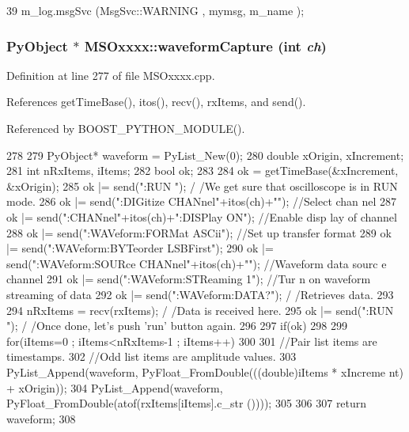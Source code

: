 \begin{DoxyCode}
39 { m_log.msgSvc (MsgSvc::WARNING , mymsg, m_name ); }
\end{DoxyCode}
\hypertarget{classMSOxxxx_aed78c680bcec9e14a88eedf7b291518c}{
\subsubsection[{waveformCapture}]{\setlength{\rightskip}{0pt plus 5cm}PyObject $\ast$ MSOxxxx::waveformCapture (int {\em ch})}}
\label{classMSOxxxx_aed78c680bcec9e14a88eedf7b291518c}


Definition at line 277 of file MSOxxxx.cpp.

References getTimeBase(), itos(), recv(), rxItems, and send().

Referenced by BOOST\_\-PYTHON\_\-MODULE().


\begin{DoxyCode}
278 {
279     PyObject* waveform = PyList_New(0);
280     double xOrigin, xIncrement;
281     int nRxItems, iItems;
282     bool ok;
283 
284     ok  = getTimeBase(&xIncrement, &xOrigin);
285     ok |= send(":RUN \n");                                                                  /
      /We get sure that oscilloscope is in RUN mode.
286     ok |= send(":DIGitize CHANnel"+itos(ch)+"\n");                  //Select chan
      nel
287     ok |= send(":CHANnel"+itos(ch)+":DISPlay ON\n");                //Enable disp
      lay of channel
288     ok |= send(":WAVeform:FORMat ASCii\n");                                 //Set
      up transfer format
289     ok |= send(":WAVeform:BYTeorder LSBFirst\n");
290     ok |= send(":WAVeform:SOURce CHANnel"+itos(ch)+"\n");   //Waveform data sourc
      e channel
291     ok |= send(":WAVeform:STReaming 1\n");                                  //Tur
      n on waveform streaming of data
292     ok |= send(":WAVeform:DATA?\n");                                                /
      /Retrieves data.
293 
294     nRxItems = recv(rxItems);                                                               /
      /Data is received here.
295     ok |= send(":RUN \n");                                                                  /
      /Once done, let's push 'run' button again.
296 
297     if(ok)
298     {
299         for(iItems=0 ; iItems<nRxItems-1 ; iItems++)
300         {
301             //Pair list items are timestamps.
302             //Odd  list items are amplitude values.
303             PyList_Append(waveform, PyFloat_FromDouble(((double)iItems * xIncreme
      nt) + xOrigin));
304             PyList_Append(waveform, PyFloat_FromDouble(atof(rxItems[iItems].c_str
      ())));
305         }
306     }
307     return waveform;
308 }
\end{DoxyCode}


